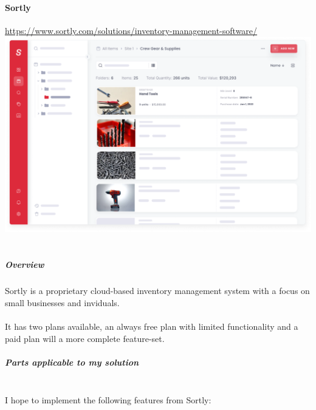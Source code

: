 \documentclass{article}
\begin{document}
\paragraph{\\Sortly}
\url{https://www.sortly.com/solutions/inventory-management-software/}\\

\includegraphics[width=15cm]{sortly_homepage_mockup_1.png}

\subparagraph{\\Overview\\}

Sortly is a proprietary cloud-based inventory management system with a focus on small businesses and inviduals.\\\\
It has two plans available, an always free plan with limited functionality and a paid plan will a more complete feature-set.

\subparagraph{Parts applicable to my solution\\\\}

I hope to implement the following features from Sortly:
\end{document}
